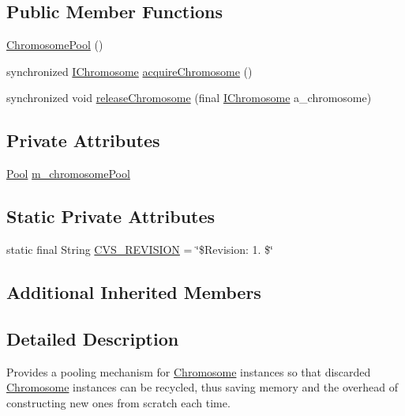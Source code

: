 \subsection*{Public Member Functions}
\begin{DoxyCompactItemize}
\item 
\hyperlink{classorg_1_1jgap_1_1impl_1_1_chromosome_pool_aac54417db26316ae6e15c3d8877f50a3}{Chromosome\-Pool} ()
\item 
synchronized \hyperlink{interfaceorg_1_1jgap_1_1_i_chromosome}{I\-Chromosome} \hyperlink{classorg_1_1jgap_1_1impl_1_1_chromosome_pool_a3d6d1ebd5a974a85a62e89897a2be0a7}{acquire\-Chromosome} ()
\item 
synchronized void \hyperlink{classorg_1_1jgap_1_1impl_1_1_chromosome_pool_a2db14878acc50a99083385dc8bb51e68}{release\-Chromosome} (final \hyperlink{interfaceorg_1_1jgap_1_1_i_chromosome}{I\-Chromosome} a\-\_\-chromosome)
\end{DoxyCompactItemize}
\subsection*{Private Attributes}
\begin{DoxyCompactItemize}
\item 
\hyperlink{classorg_1_1jgap_1_1impl_1_1_pool}{Pool} \hyperlink{classorg_1_1jgap_1_1impl_1_1_chromosome_pool_a04c0039ba1e078a78ceecfe2e75cbb22}{m\-\_\-chromosome\-Pool}
\end{DoxyCompactItemize}
\subsection*{Static Private Attributes}
\begin{DoxyCompactItemize}
\item 
static final String \hyperlink{classorg_1_1jgap_1_1impl_1_1_chromosome_pool_a33d1323ce195bba5e48f029024db061b}{C\-V\-S\-\_\-\-R\-E\-V\-I\-S\-I\-O\-N} = \char`\"{}\$Revision\-: 1. \$\char`\"{}
\end{DoxyCompactItemize}
\subsection*{Additional Inherited Members}


\subsection{Detailed Description}
Provides a pooling mechanism for \hyperlink{classorg_1_1jgap_1_1_chromosome}{Chromosome} instances so that discarded \hyperlink{classorg_1_1jgap_1_1_chromosome}{Chromosome} instances can be recycled, thus saving memory and the overhead of constructing new ones from scratch each time.

